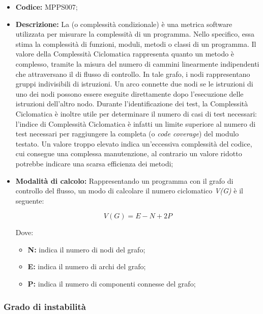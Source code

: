 \documentclass[../NormediProgetto.tex]{subfiles}
\begin{document}
\begin{itemize}
	\item \textbf{Codice:} MPPS007;
	
	\item \textbf{Descrizione:} La  (o complessità condizionale) è una metrica software utilizzata per misurare la complessità di un programma. Nello specifico, essa stima la complessità di funzioni, moduli, metodi o classi di un programma. Il valore della Complessità Ciclomatica rappresenta quanto un metodo è complesso, tramite la misura del numero di cammini linearmente indipendenti che attraversano il  di flusso di controllo. In tale grafo, i nodi rappresentano gruppi indivisibili di istruzioni. Un arco connette due nodi se le istruzioni di uno dei nodi possono essere eseguite direttamente dopo l'esecuzione delle istruzioni dell'altro nodo. Durante l’identificazione dei test, la Complessità Ciclomatica è inoltre utile per determinare il numero di casi di test necessari: l’indice di Complessità Ciclomatica è infatti un limite superiore al numero di test necessari per raggiungere la completa  (o \textit{code coverage}) del modulo testato. Un valore troppo elevato indica un'eccessiva complessità del codice, cui consegue una complessa manutenzione, al contrario un valore ridotto potrebbe indicare una scarsa efficienza dei metodi;
	
	\item \textbf{Modalità di calcolo:} Rappresentando un programma con il grafo di controllo del flusso, un modo di calcolare il numero ciclomatico \textit{V(G)} è il seguente:
	
	\[ V(G) = E - N + 2P \]
	
	Dove:
	
	\begin{itemize}
		\item \textbf{N:} indica il numero di nodi del grafo;
		\item \textbf{E:} indica il numero di archi del grafo;
		\item \textbf{P:} indica il numero di componenti connesse del grafo;
	\end{itemize}
\end{itemize}

\subsubsection{Grado di instabilità}
\end{document}
